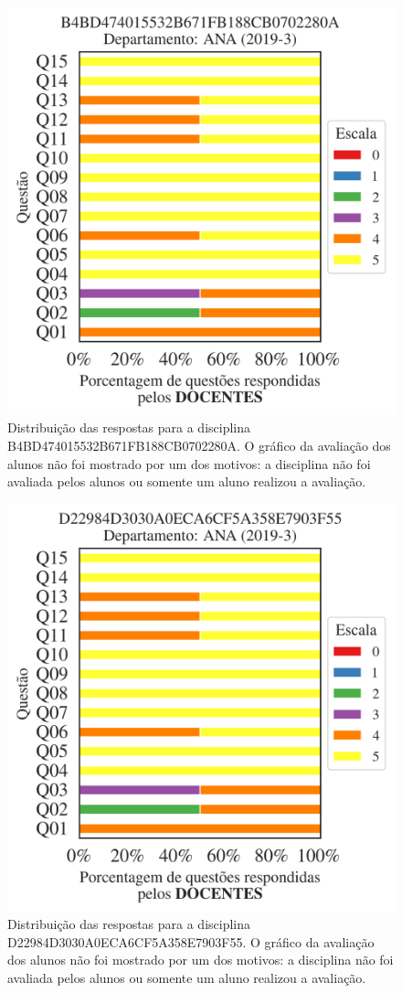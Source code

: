 \documentclass[a4paper,10pt]{article}
\begin{document}
\begin{figure}[h]
\centering
\includegraphics[width=0.485\linewidth]{analise_disciplina_departamento_ANA_B4BD474015532B671FB188CB0702280A_docentes.png}
\caption{\label{fig:analise_geral_departamento}                Distribuição das respostas para a disciplina B4BD474015532B671FB188CB0702280A. O gráfico da avaliação dos alunos não foi mostrado  por um dos motivos:  a disciplina não foi avaliada pelos alunos ou somente um aluno realizou a avaliação. }
\end{figure}
\begin{figure}[h]
\centering
\includegraphics[width=0.485\linewidth]{analise_disciplina_departamento_ANA_D22984D3030A0ECA6CF5A358E7903F55_docentes.png}
\caption{\label{fig:analise_geral_departamento}                Distribuição das respostas para a disciplina D22984D3030A0ECA6CF5A358E7903F55. O gráfico da avaliação dos alunos não foi mostrado  por um dos motivos:  a disciplina não foi avaliada pelos alunos ou somente um aluno realizou a avaliação. }
\end{figure}
\end{document}
